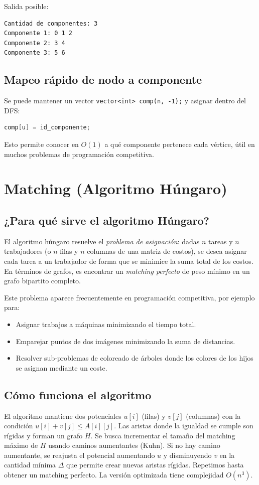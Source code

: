 Salida posible:
\begin{verbatim}
Cantidad de componentes: 3
Componente 1: 0 1 2
Componente 2: 3 4
Componente 3: 5 6
\end{verbatim}

\subsection*{Mapeo rápido de nodo a componente}
Se puede mantener un vector \texttt{vector<int> comp(n, -1);} y asignar dentro del DFS:
\begin{lstlisting}[language=C++,caption=Asignación de componente]
comp[u] = id_componente;
\end{lstlisting}
Esto permite conocer en $O(1)$ a qué componente pertenece cada vértice, útil en muchos problemas de programación competitiva.

\section{Matching (Algoritmo Húngaro)}
\subsection*{¿Para qué sirve el algoritmo Húngaro?}
El algoritmo húngaro resuelve el \textit{problema de asignación}: dadas $n$ tareas y $n$ trabajadores (o $n$ filas y $n$ columnas de una matriz de costos), se desea asignar cada tarea a un trabajador de forma que se minimice la suma total de los costos. En términos de grafos, es encontrar un \textit{matching perfecto} de peso mínimo en un grafo bipartito completo.

Este problema aparece frecuentemente en programación competitiva, por ejemplo para:
\begin{itemize}
  \item Asignar trabajos a máquinas minimizando el tiempo total.
  \item Emparejar puntos de dos imágenes minimizando la suma de distancias.
  \item Resolver sub-problemas de coloreado de árboles donde los colores de los hijos se asignan mediante un coste.
\end{itemize}

\subsection*{Cómo funciona el algoritmo}
El algoritmo mantiene dos potenciales $u[i]$ (filas) y $v[j]$ (columnas) con la condición $u[i]+v[j]\leq A[i][j]$. Las aristas donde la igualdad se cumple son rígidas y forman un grafo $H$. Se busca incrementar el tamaño del matching máximo de $H$ usando caminos aumentantes (Kuhn). Si no hay camino aumentante, se reajusta el potencial aumentando $u$ y disminuyendo $v$ en la cantidad mínima $\Delta$ que permite crear nuevas aristas rígidas. Repetimos hasta obtener un matching perfecto. La versión optimizada tiene complejidad $O(n^3)$.

